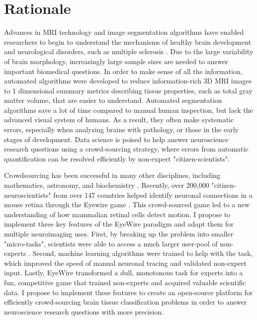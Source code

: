 \section*{Rationale}

Advances in MRI technology and image segmentation algorithms have enabled researchers to begin to understand the mechanisms of healthy brain development \cite{giedd1999brain} and neurological disorders, such as multiple sclerosis \cite{bakshi2008mri}. Due to the large variability of brain morphology, increasingly large sample sizes are needed to answer important biomedical questions. In order to make sense of all the information, automated algorithms were developed to reduce information-rich 3D MRI images to 1 dimensional summary metrics describing tissue properties, such as total gray matter volume, that are easier to understand. Automated  segmentation algorithms save a lot of time compared to manual human inspection, but lack the advanced visual system of humans. As a result, they often make systematic errors, especially when analyzing brains with pathology, or those in the early stages of development. Data science is poised to help answer neuroscience research questions using a crowd-sourcing strategy, where errors from automatic quantification can be resolved efficiently by non-expert "citizen-scientists".

Crowdsourcing has been successful in many other disciplines, including mathematics, astronomy, and biochemistry \cite{wiggins2011conservation}. Recently, over 200,000 "citizen-neuroscientists"  from over 147 countries helped identify neuronal connections in a mouse retina through the Eyewire game \cite{kim2014space}. This crowd-sourced game led to a new understanding of how mammalian retinal cells detect motion. I propose to implement three key features of the EyeWire paradigm and adapt them for multiple neuroimaging uses. First, by breaking up the problem into smaller "micro-tasks", scientists were able to access a much larger user-pool of non-experts \cite{kittur2008crowdsourcing}. Second, machine learning algorithms were trained to help with the task, which improved the speed of manual neuronal tracing and validated non-expert input. Lastly, EyeWire transformed a dull, monotonous task for experts into a fun, competitive game that trained non-experts and acquired valuable scientific data. I propose to implement these features to create an open-source platform for efficiently crowd-sourcing brain tissue classification problems in order to answer neuroscience research questions with more precision.

